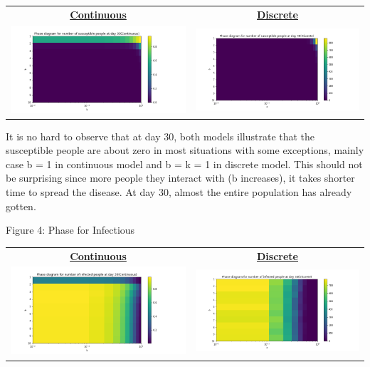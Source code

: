 \documentclass[11pt,a4paper]{article}
\begin{document}
 \begin{center}
 	
 	\begin{tabular}{c c}
 		\textbf{\underline{Continuous}} &
 		\textbf{\underline{Discrete}} \\
 		\includegraphics[width=.5\textwidth]{Phase_Continuous_S.png} & \includegraphics[width=.5\textwidth]{Phase_Discrete_S.png}
 	\end{tabular}
 
 \end{center}
\medskip \noindent
It is no hard to observe that at day 30, both models illustrate that the susceptible people are about zero in most situations with some exceptions, mainly case b = 1 in continuous model and b = k = 1 in discrete model. This should not be surprising since more people they interact with (b increases), it takes shorter time to spread the disease. At day 30, almost the entire population has already gotten. 


  \begin{center}
 	Figure 4: Phase for Infectious
 \end{center}
 \begin{center}
 	
 	\begin{tabular}{c c}
 		\textbf{\underline{Continuous}} &
 		\textbf{\underline{Discrete}} \\
 		\includegraphics[width=.5\textwidth]{Phase_Continuous_I.png} & \includegraphics[width=.5\textwidth]{Phase_Discrete_I.png}
 	\end{tabular}
 
 \end{center}
\end{document}
